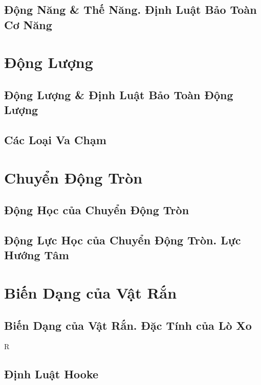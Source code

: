 \documentclass[oneside]{book}
\numberwithin{equation}{section}
\begin{document}

\section{Động Năng \& Thế Năng. Định Luật Bảo Toàn Cơ Năng}


\chapter{Động Lượng}

\section{Động Lượng \& Định Luật Bảo Toàn Động Lượng}


\section{Các Loại Va Chạm}


\chapter{Chuyển Động Tròn}

\section{Động Học của Chuyển Động Tròn}


\section{Động Lực Học của Chuyển Động Tròn. Lực Hướng Tâm}


\chapter{Biến Dạng của Vật Rắn}

\section{Biến Dạng của Vật Rắn. Đặc Tính của Lò Xo}

R
\section{Định Luật Hooke}


\printbibliography[heading=bibintoc]
	
\end{document}
